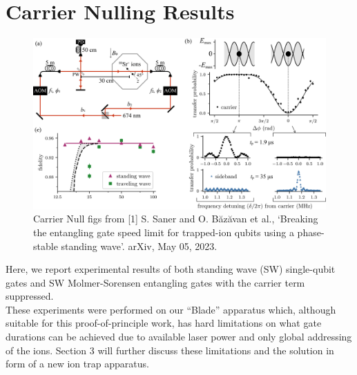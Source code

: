 \documentclass[12pt]{iopart}
\begin{document}


\section{Carrier Nulling Results}

\begin{figure}
  \begin{center}
   \noindent\includegraphics[width=\linewidth]{figures/cnulled_figs.png}
  \end{center}
  \caption{Carrier Null figs from [1] S. Saner and O. Băzăvan et al., `Breaking the
    entangling gate speed limit for trapped-ion qubits using a
    phase-stable standing wave'. arXiv, May 05, 2023.}

  \label{fig:cnull}
\end{figure}

    Here, we report experimental results of both standing wave (SW)
    single-qubit gates and SW Molmer-Sorensen
    entangling gates with the carrier term suppressed.\\
    These experiments were performed on our ``Blade'' apparatus which,
    although suitable for this proof-of-principle work, has hard
    limitations on what gate durations can be achieved due to
    available laser power and only global addressing of the ions.
    Section 3 will further discuss these limitations and the solution
    in form of a new ion trap apparatus.\\
\end{document}
